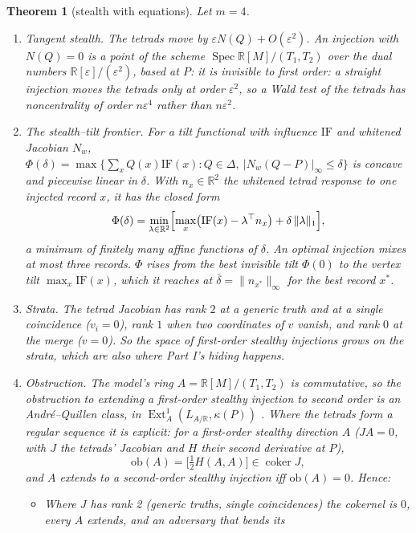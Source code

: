\documentclass[11pt]{article}
\newtheorem{theorem}{Theorem}\renewcommand{\thetheorem}{\Alph{theorem}}
\theoremstyle{definition}\newtheorem{definition}{Definition}\newtheorem{remark}{Remark}
\newcommand{\R}{\mathbb R}
\begin{document}
\begin{theorem}[stealth with equations]\label{thm:G}
Let $m=4$.
\begin{enumerate}
\item[(1)] \emph{Tangent stealth.} The tetrads move by $\varepsilon N(Q)+O(\varepsilon^2)$. An injection with $N(Q)=0$ is a point of the
scheme $\operatorname{Spec}\R[M]/(T_1,T_2)$ over the dual numbers $\R[\varepsilon]/(\varepsilon^2)$, based at $P$: it is invisible to
first order: a straight injection moves the tetrads only at order $\varepsilon^2$, so a Wald test of the tetrads has noncentrality of
order $n\varepsilon^4$ rather than $n\varepsilon^2$.
\item[(2)] \emph{The stealth--tilt frontier.} For a tilt functional with influence $\mathrm{IF}$ and whitened Jacobian $N_w$,
$\Phi(\delta)=\max\{\sum_xQ(x)\mathrm{IF}(x):Q\in\Delta,\ |N_w(Q-P)|_\infty\le\delta\}$ is concave and piecewise linear in $\delta$. With
$n_x\in\R^2$ the whitened tetrad response to one injected record $x$, it has the closed form
\[
\Phi(\delta)=\min_{\lambda\in\R^2}\Bigl[\max_x\bigl(\mathrm{IF}(x)-\lambda^\top n_x\bigr)+\delta\,\|\lambda\|_1\Bigr],
\]
a minimum of finitely many affine functions of $\delta$. An optimal injection mixes at most three records. $\Phi$ rises from the best
invisible tilt $\Phi(0)$ to the vertex tilt $\max_x\mathrm{IF}(x)$, which it reaches at $\bar\delta=\|n_{x^*}\|_\infty$ for the best
record $x^*$.
\item[(3)] \emph{Strata.} The tetrad Jacobian has rank $2$ at a generic truth and at a single coincidence ($v_i=0$), rank $1$ when two
coordinates of $v$ vanish, and rank $0$ at the merge ($v=0$). So the space of first-order stealthy injections grows on the strata,
which are also where Part I's hiding happens.
\item[(4)] \emph{Obstruction.} The model's ring $A=\R[M]/(T_1,T_2)$ is commutative, so the obstruction to extending a first-order
stealthy injection to second order is an André--Quillen class, in $\operatorname{Ext}^1_A(L_{A/\R},\kappa(P))$ \cite{Quillen1970,Andre1974}.
Where the tetrads form a regular sequence it is explicit: for a first-order stealthy direction $A$ ($JA=0$, with $J$ the tetrads'
Jacobian and $H$ their second derivative at $P$),
\[
\mathrm{ob}(A)=\bigl[\tfrac12H(A,A)\bigr]\in\operatorname{coker}J ,
\]
and $A$ extends to a second-order stealthy injection iff $\mathrm{ob}(A)=0$. Hence:
\begin{itemize}
\item Where $J$ has rank 2 (generic truths, single coincidences) the cokernel is $0$, every $A$ extends, and an adversary that bends its

\end{itemize}
\end{enumerate}
\end{theorem}
\end{document}
